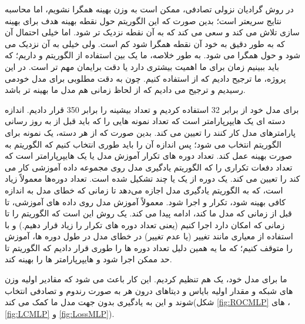 \documentclass[12pt,onecolumn,a4paper]{article}
\begin{document}
\newpage


در روش گرادیان نزولی تصادفی، ممکن است به وزن بهینه همگرا نشویم، اما محاسبه نتایج سریعتر است؛ بدین صورت که این الگوریتم حول نقطه بهینه هدف برای بهینه سازی تلاش می کند و سعی می کند که به آن نقطه نزدیک تر شود. اما خیلی احتمال آن که به طور دقیق به خود آن نقطه همگرا شود کم است. ولی خیلی به آن نزدیک می شود و حول  همگرا می شود. به طور خلاصه، ما یک  بین استفاده از الگوریتم  و  داریم؛ که باید ببینیم زمان برای ما اهمیت بیشتری دارد یا دقت برایمان مهم تر است. در این پروژه، ما ترجیح دادیم که از  استفاده کنیم. چون به دقت مطلوبی برای مدل خودمی رسیدیم و ترجیح می دادیم که از لحاظ زمانی هم مدل ما بهینه تر باشد.

برای مدل خود از  برابر 32 استفاده کردیم و تعداد بیشینه  را برابر 350 قرار دادیم.
اندازه دسته ای یک هایپرپارامتر است که تعداد نمونه هایی را که باید قبل از به روز رسانی پارامترهای مدل کار کنند را تعیین می کند. بدین صورت که از هر دسته، یک نمونه برای الگوریتم  انتخاب می شود؛ پس اندازه آن را باید طوری انتخاب کنیم که الگوریتم  به صورت بهینه عمل کند.
تعداد دوره های تکرار آموزش مدل یا  یک هایپرپارامتر است که تعداد دفعات تکراری را که الگوریتم یادگیری مدل روی مجموعه داده آموزشی کار می کند را تعیین می کند. یک دوره از یک یا چند  تشکیل شده است. تعداد دوره‌ها معمولاً زیاد است، که به الگوریتم یادگیری مدل اجازه می‌دهد تا زمانی که خطای مدل به اندازه کافی بهینه شود، تکرار و اجرا شود. معمولاً آموزش مدل روی داده های آموزشی، تا قبل از زمانی که مدل ما  کند، ادامه پیدا می کند. یک روش این است که الگوریتم را تا زمانی که امکان دارد اجرا کنیم (یعنی تعداد دوره های تکرار را زیاد قرار دهیم.) و با استفاده از معیاری مانند تغییر (یا عدم تغییر) در خطای مدل در طول دوره ها، آموزش را متوقف کنیم؛ که ما یه همین دلیل تعداد دوره ها را طوری قرار دادیم که الگوریتم تا حد ممکن اجرا شود و هایپرپارامتر ها را بهینه کند.

ما برای مدل خود، یک  هم تنظیم کردیم. این کار باعث می شود که مقادیر اولیه وزن های شبکه و مقدار اولیه بایاس و دیتاهای درون هر  به صورت رندوم و تصادفی انتخاب شوند و این به یادگیری بدون جهت مدل ما کمک می کند(شکل \ref{fig:ROCMLP} های ، \ref{fig:LCMLP} و \ref{fig:LossMLP}).
\end{document}
